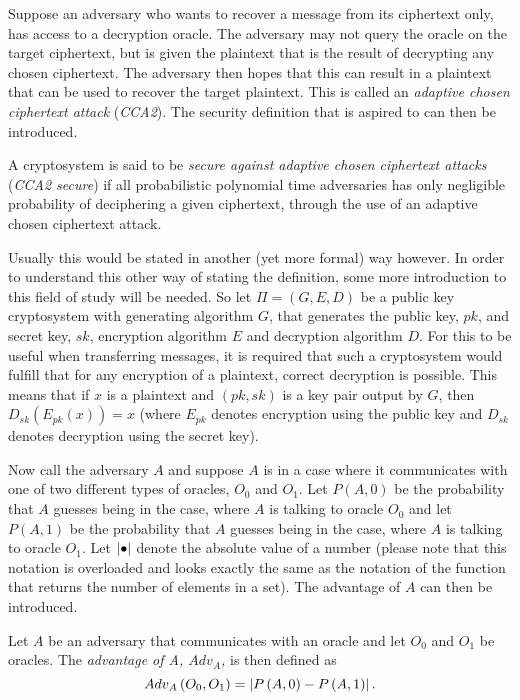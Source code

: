 Suppose an adversary who wants to recover a message from its ciphertext only, has access to a decryption oracle. The adversary may not query the oracle on the target ciphertext, but is given the plaintext that is the result of decrypting any chosen ciphertext. The adversary then hopes that this can result in a plaintext that can be used to recover the target plaintext. This is called an \emph{adaptive chosen ciphertext attack} (\emph{CCA2}).
The security definition that is aspired to can then be introduced.
\begin{defi}
\label{def:ccaSecInf}
	A cryptosystem is said to be \emph{secure against adaptive chosen ciphertext attacks} (\emph{CCA2 secure}) if all probabilistic polynomial time adversaries has only negligible probability of deciphering a given ciphertext, through the use of an adaptive chosen ciphertext attack.
\end{defi}

Usually this would be stated in another (yet more formal) way however. In order to understand this other way of stating the definition, some more introduction to this field of study will be needed. So let $\Pi = \left(G,E,D\right)$ be a public key cryptosystem with generating algorithm $G$, that generates the public key, $pk$, and secret key, $sk$, encryption algorithm $E$ and decryption algorithm $D$. For this to be useful when transferring messages, it is required that such a cryptosystem would fulfill that for any encryption of a plaintext, correct decryption is possible. This means that if $x$ is a plaintext and $\left(pk, sk\right)$ is a key pair output by $G$, then $D_{sk}\left(E_{pk}\left(x\right)\right) = x$ (where $E_{pk}$ denotes encryption using the public key and $D_{sk}$ denotes decryption using the secret key).

Now call the adversary $A$ and suppose $A$ is in a case where it communicates with one of two different types of oracles, $O_0$ and $O_1$. Let $P\left(A,0\right)$ be the probability that $A$ guesses being in the case, where $A$ is talking to oracle $O_0$ and let $P\left(A,1\right)$ be the probability that $A$ guesses being in the case, where $A$ is talking to oracle $O_1$. Let $\left\vert \bullet \right\vert$ denote the absolute value of a number (please note that this notation is overloaded and looks exactly the same as the notation of the function that returns the number of elements in a set). The advantage of $A$ can then be introduced.
\begin{defi}
\label{def:advantage}
	Let $A$ be an adversary that communicates with an oracle and let $O_0$ and $O_1$ be oracles. The \emph{advantage of A, $Adv_A$,} is then defined as
	\[
		Adv_A\left(O_0, O_1\right) = \left\vert P\left(A, 0\right) - P\left(A,1\right) \right\vert.
	\]
\end{defi}

